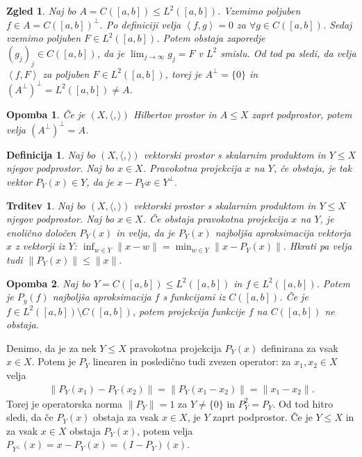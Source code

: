 \documentclass[10pt, a4paper]{article}
\newtheorem{trditev}[izr]{Trditev}
\newtheorem{defi}{Definicija}[section]
\newenvironment{noticeB}{%
  \tcolorbox[%
  notitle,
  empty,
  enhanced,  %
  breakable,
  coltext=black,
  colback=white, 
  fontupper=\rmfamily,
  parbox=false,
  noparskip,
  sharp corners,
  boxrule=-1pt,  %
  frame hidden,
  left=7pt,  %
  right=7pt,
  top=5pt,
  bottom=5pt,
  before skip=2.5ex plus 2pt,
  after skip=2.5ex plus 2pt,
  borderline west = {1.5pt}{-0.1pt}{blue!30!black}, %
  overlay unbroken and last={%
    \draw[color=black, line width=1.25pt]
    ($(frame.south west)+(1.pt, -0.1pt)$) -- ++(2em, 0);
  }
  ]}
{\endtcolorbox}
\newenvironment{definicija}{\begin{defi}\begin{noticeB}}{%
    \end{noticeB}\end{defi}}
\newtheorem*{opomba}{Opomba}
\newtheorem{zgled}{Zgled}[section]
\newcommand{\sprod}[2]{\left\langle {#1},{#2} \right\rangle}
\begin{document}
\begin{zgled}
    Naj bo $A = C([a, b]) \leq L^2 ([a, b])$. Vzemimo poljuben $f \in A = C([a, b])^\perp$.
    Po definiciji velja $\sprod{f}{g} = 0$ za $\forall g \in C([a, b])$.
    Sedaj vzemimo poljuben $F \in L^2 ([a, b])$. Potem obstaja zaporedje $(g_j)_j \in C([a, b])$,
    da je $\lim_{j \to \infty} g_j = F$ v $L^2$ smislu. Od tod pa sledi, da velja $\sprod{f}{F}$ za poljuben $F \in L^2([a, b])$,
    torej je $A^\perp = \{0\}$ in $(A^\perp)^\perp = L^2 ([a, b]) \neq A$.
\end{zgled}

\begin{opomba}
    Če je $(X, \langle,\rangle)$ Hilbertov prostor in $A \leq X$ zaprt podprostor,
    potem velja $(A^\perp)^\perp = A$.
\end{opomba}

\begin{definicija}
    Naj bo $(X, \langle, \rangle)$ vektorski prostor s skalarnim produktom in
    $Y \leq X$ njegov podprostor. Naj bo $x \in X$.
    Pravokotna projekcija $x$ na $Y$, če obstaja, je tak vektor $P_Y (x) \in Y$, da je 
    $x - P_Y x \in Y^\perp.$    
\end{definicija}

\begin{trditev}
    Naj bo $(X, \langle, \rangle)$ vektorski prostor s skalarnim produktom in
$Y \leq X$ njegov podprostor. Naj bo $x \in X$. Če obstaja pravokotna projekcija $x$ na $Y$, je enolično določen $P_Y (x)$ 
in velja, da je $P_Y (x)$ najboljša aproksimacija vektorja $x$ z vektorji iz $Y$:
$\inf_{w \in Y} \|x - w\| = \min_{w \in Y} \| x - P_Y(x)\|.$
Hkrati pa velja tudi $\|P_Y(x)\| \leq \|x\|.$
\end{trditev}

\begin{opomba}
    Naj bo $Y = C([a, b]) \leq L^2 ([a, b])$ in $f \in L^2 ([a, b])$.
    Potem je $P_y (f)$ najboljša aproksimacija $f$ s funkcijami iz $C([a, b])$.
    Če je $f \in L^2 ([a, b]) \setminus C([a, b])$, potem projekcija funkcije $f$ na $C([a, b])$ ne obstaja.
\end{opomba}

Denimo, da je za nek $Y \leq X$ pravokotna projekcija $P_Y (x)$ definirana za vsak $x \in X$.
Potem je $P_Y$ linearen in posledično tudi zvezen operator: za $x_1, x_2 \in X$ velja 
\begin{align*}
    \|P_Y (x_1) - P_Y (x_2)\| = \|P_Y (x_1 - x_2)\|
    = \|x_1 - x_2\|.
\end{align*}
Torej je operatorska norma $\|P_Y\| = 1$ za $Y \neq \{0\}$ in $P_Y ^2 = P_Y$.
Od tod hitro sledi, da če $P_Y (x)$ obstaja za vsak $x \in X$, je $Y$ zaprt podprostor.
Če je $Y \leq X$ in za vsak $x \in X$ obstaja $P_Y(x)$, potem velja $P_{Y^\perp} (x) = x - P_Y (x) = (I - P_Y)(x)$.
\end{document}
